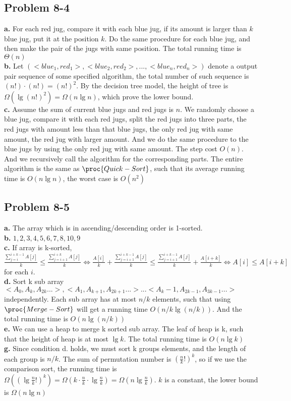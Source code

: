 \documentclass[12pt]{article}
\theoremstyle{definition}
\theoremstyle{remark}
\begin{document}
\subsection*{Problem 8-4}
\textbf{a.} For each red jug, compare it with each blue jug, if its amount is larger than $k$ blue jug, put it at the position $k$. Do the same procedure for each blue jug, and then make the pair of the jugs with same position. The total running time is $\Theta(n)$\\
\textbf{b.} Let $(<blue_1,red_1>,<blue_2,red_2>,...,<blue_n,red_n>)$ denote a output pair sequence of some specified algorithm, the total number of such sequence is $(n!)\cdot(n!)=(n!)^2$. By the decision tree model, the height of tree is $\Omega(\lg(n!)^2)=\Omega(n\lg{n})$, which prove the lower bound.\\
\textbf{c.} Assume the sum of current blue jugs and red jugs is $n$. We randomly choose a blue jug, compare it with each red jugs, split the red jugs into three parts, the red jugs with amount less than that blue jugs, the only red jug with same amount, the red jug with larger amount. And we do the same procedure to the blue jugs by using the only red jug with same amount. The step cost $O(n)$. And we recursively call the algorithm for the corresponding parts. The entire algorithm is the same as $\proc{Quick-Sort}$, such that its average running time is $O(n\lg{n})$, the worst case is $O(n^2)$
\subsection*{Problem 8-5}
\textbf{a.} The array which is in ascending/descending order is 1-sorted.\\
\textbf{b.} $1,2,3,4,5,6,7,8,10,9$\\
\textbf{c.} If array is k-sorted, $\frac{\sum_{j=i}^{i+k-1}A[j]}{k}\le\frac{\sum_{j=i+1}^{i+k}A[j]}{k}\iff\frac{A[i]}{k}+\frac{\sum_{j=i+1}^{i+k-1}A[j]}{k}\le\frac{\sum_{j=i+1}^{i+k-1}A[j]}{k}+\frac{A[i+k]}{k}\iff A[i]\le A[i+k]$ for each $i$.\\
\textbf{d.} Sort k sub array $<A_0,A_k,A_{2k}...>,<A_1,A_{k+1},A_{2k+1}...>...<A_k-1,A_{2k-1},A_{3k-1}...>$ independently. Each sub array has at most $n/k$ elements, such that using $\proc{Merge-Sort}$ will get a running time $O(n/k\lg(n/k))$. And the total running time is $O(n\lg(n/k))$\\
\textbf{e.} We can use a heap to merge k sorted sub array. The leaf of heap is k, such that the height of heap is at most $\lg{k}$. The total running time is $O(n\lg{k})$\\
\textbf{g.} Since condition d. holds, we must sort k groups elements, and the length of each group is $n/k$. The sum of permutation number is $(\frac{n}{k}!)^k$, so if we use the comparison sort, the running time is $\Omega((\lg\frac{n}{k}!)^k)=\Omega(k\cdot\frac{n}{k}\cdot\lg\frac{n}{k})=\Omega(n\lg\frac{n}{k})$. $k$ is a constant, the lower bound is $\Omega(n\lg{n})$
\end{document}
